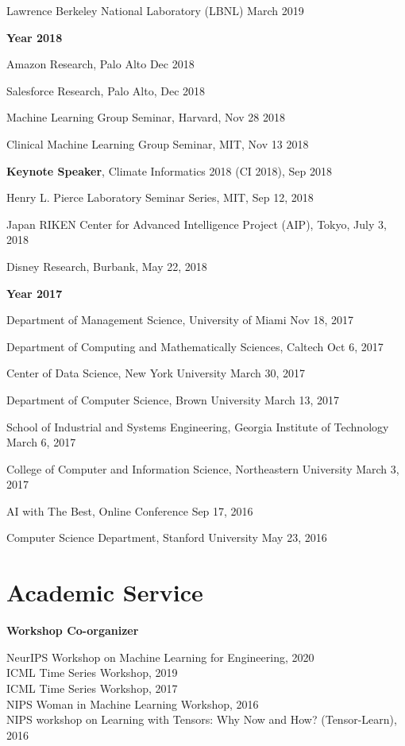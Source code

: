 \documentclass[margin,line]{res}
\begin{document}
\begin{resume}
 Lawrence Berkeley National Laboratory (LBNL) \hfill{March 2019}

 {\bf Year  2018}
 
Amazon Research, Palo Alto \hfill{Dec 2018}

Salesforce Research, Palo Alto, \hfill{Dec 2018}

Machine Learning Group Seminar, Harvard, \hfill {Nov 28 2018} 

Clinical Machine Learning Group Seminar, MIT, \hfill {Nov 13  2018} 


\textbf{Keynote Speaker},  Climate Informatics 2018 (CI 2018), \hfill {Sep 2018} 


Henry L. Pierce Laboratory Seminar Series, MIT, \hfill {Sep 12, 2018}

Japan RIKEN  Center for Advanced Intelligence Project (AIP), Tokyo, \hfill {July 3, 2018}

Disney Research, Burbank, \hfill {May 22, 2018}

 {\bf Year  2017}
 
Department of Management Science,  University of Miami  \hfill {Nov 18, 2017}


Department of Computing and Mathematically Sciences,  Caltech  \hfill {Oct 6, 2017}


Center of Data Science, New York University  \hfill {March 30, 2017}


Department of Computer Science, Brown University   \hfill {March 13, 2017}



School of Industrial and Systems Engineering, Georgia Institute of Technology  \hfill {March 6, 2017}


College of Computer and Information Science, Northeastern University  \hfill {March 3, 2017}


 
 AI with The Best, Online Conference \hfill {Sep 17, 2016}
 
 
Computer Science Department,  Stanford University  \hfill {May 23, 2016}
 
 


\section{\sc Academic Service}
{\bf Workshop Co-organizer}

NeurIPS  Workshop on Machine Learning for Engineering, 2020\\
ICML Time Series  Workshop, 2019 \\
ICML Time Series  Workshop, 2017 \\
NIPS Woman in Machine Learning Workshop, 2016 \\
NIPS workshop on Learning with Tensors: Why Now and How? (Tensor-Learn), 2016 \\




\end{resume}
\end{document}
